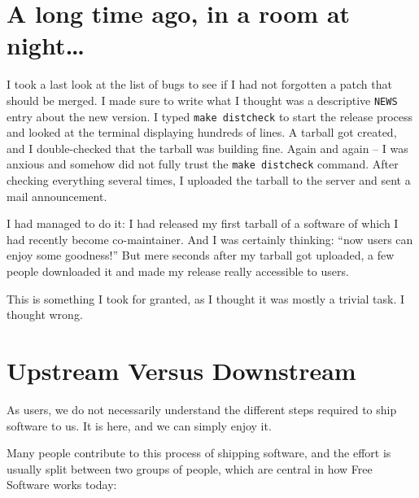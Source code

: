 

\section*{A long time ago, in a room at night\ldots}

\noindent{}I took a last look at the list of bugs to see if I had not forgotten a patch
that should be merged. I made sure to write what I thought was a descriptive
\texttt{NEWS} entry about the new version. I typed \texttt{make distcheck} to
start the release process and looked at the terminal displaying hundreds of lines.
A tarball got created, and I double-checked that the tarball was building fine.
Again and again -- I was anxious and somehow did not fully trust the
\texttt{make distcheck} command. After checking everything several times, I
uploaded the tarball to the server and sent a mail announcement.

I had managed to do it: I had released my first tarball of a software of which
I had recently become co-maintainer. And I was certainly thinking: ``now users
can enjoy some goodness!'' But mere seconds after my tarball got uploaded, a few
people downloaded it and made my release really accessible to users.

This is something I took for granted, as I thought it was mostly a trivial
task. I thought wrong.

\section*{Upstream Versus Downstream}

As users, we do not necessarily understand the different steps required to ship
software to us. It is here, and we can simply enjoy it.

Many people contribute to this process of shipping software, and the effort is
usually split between two groups of people, which are central in how Free
Software works today:

